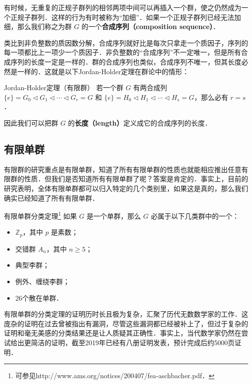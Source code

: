 有时候，无重复的正规子群列的相邻两项中间可以再插入一个群，使之仍然成为一个正规子群列．这样的行为有时被称为“加细”．如果一个正规子群列已经无法加细，那么我们称之为群 $G$ 的一个\textbf{合成序列（composition sequence）}．

类比到非负整数的质因数分解，合成序列就好比是每次只拿走一个质因子，序列的每一项都比上一项少一个质因子．非负整数的“合成序列”不一定唯一，但是所有合成序列的长度一定是一样的．群的合成序列也类似，合成序列不唯一，但其长度必然是一样的．这就是以下Jordan-Holder定理在群论中的情形：

\begin{definition}{Jordan-Holder定理（有限群）}
若一个群 $G$ 有两合成列 $\{e\} = G_0 \triangleleft G_1 \triangleleft \cdots \triangleleft G_r = G$ 和 $\{e\} = H_0 \triangleleft  H_1 \triangleleft \cdots \triangleleft H_s = G$，那么必有 $r=s$．
\end{definition}

因此我们可以把群 $G$ 的\textbf{长度（length）}定义成它的合成序列的长度．
\subsection{有限单群}

有限群的研究重点是有限单群，知道了所有有限单群的性质也就能相应推出任意有限群的性质．但我们是否知道所有有限单群了呢？答案是肯定的．事实上，目前的研究表明，全体有限单群都可以归入特定的几个类别里，如果这是真的，那么我们确实已经知道了所有有限单群．

\begin{definition}{有限单群分类定理\footnote{可参见http://www.ams.org/notices/200407/fea-aschbacher.pdf．}}
如果 $G$ 是一个单群，那么 $G$ 必属于以下几类群中的一个：
\begin{itemize}
\item $\mathbb{Z}_p$，其中 $p$ 是素数；
\item 交错群 $A_n$，其中 $n\geq 5$；
\item 典型李群；
\item 例外、缠绕李群；
\item 26个散在单群．
\end{itemize}
\end{definition}

有限单群的分类定理的证明历时长且极为复杂，汇聚了历代无数数学家的工作．这庞杂的证明在过去曾被指出有漏洞，尽管这些漏洞都已经被补上了，但过于复杂的证明和毫无美感的分类结果还是让人质疑其正确性．事实上，当代数学家仍然在尝试给出更简洁的证明，截至2019年已经有八册证明发表，预计完成后约5000页证明．












